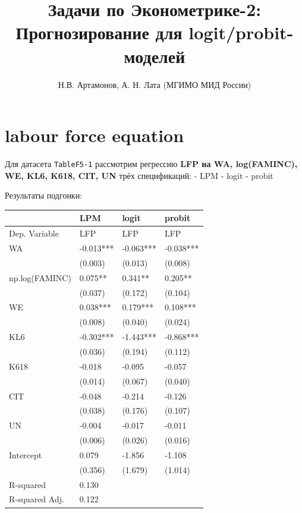 \documentclass[
  russian,
]{article}
\title{Задачи по Эконометрике-2: Прогнозирование для
logit/probit-моделей}
\author{Н.В. Артамонов, А. Н. Лата (МГИМО МИД России)}
\date{}
\newcounter{none} %
\renewcommand*\contentsname{Содержание}
\newcommand\contentsname{Содержание}
\begin{document}
\maketitle

\renewcommand*\contentsname{Содержание}
{
\setcounter{tocdepth}{3}
\tableofcontents
}

\section{labour force equation}\label{labour-force-equation}

Для датасета \texttt{TableF5-1} рассмотрим регрессию \textbf{LFP на WA,
log(FAMINC), WE, KL6, K618, CIT, UN} трёх спецификаций: - LPM - logit -
probit

Результаты подгонки:

{\def\LTcaptype{none} %
\begin{longtable}[]{@{}llll@{}}
\toprule\noalign{}
& LPM & logit & probit \\
\midrule\noalign{}
\endhead
\bottomrule\noalign{}
\endlastfoot
Dep. Variable & LFP & LFP & LFP \\
WA & -0.013*** & -0.063*** & -0.038*** \\
& (0.003) & (0.013) & (0.008) \\
np.log(FAMINC) & 0.075** & 0.341** & 0.205** \\
& (0.037) & (0.172) & (0.104) \\
WE & 0.038*** & 0.179*** & 0.108*** \\
& (0.008) & (0.040) & (0.024) \\
KL6 & -0.302*** & -1.443*** & -0.868*** \\
& (0.036) & (0.194) & (0.112) \\
K618 & -0.018 & -0.095 & -0.057 \\
& (0.014) & (0.067) & (0.040) \\
CIT & -0.048 & -0.214 & -0.126 \\
& (0.038) & (0.176) & (0.107) \\
UN & -0.004 & -0.017 & -0.011 \\
& (0.006) & (0.026) & (0.016) \\
Intercept & 0.079 & -1.856 & -1.108 \\
& (0.356) & (1.679) & (1.014) \\
R-squared & 0.130 & & \\
R-squared Adj. & 0.122 & & \\
\end{longtable}
}
\end{document}
